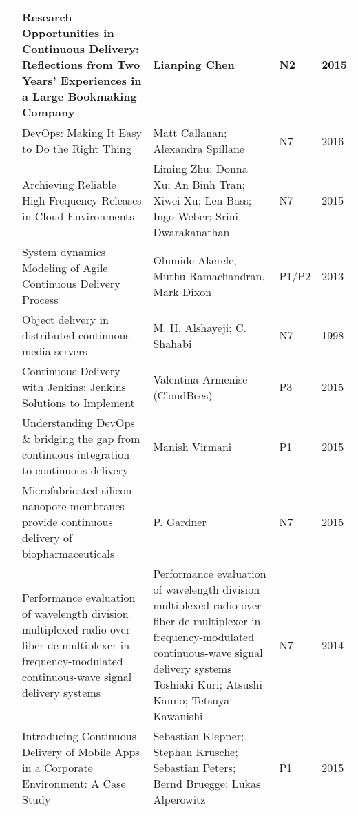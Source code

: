 \begin{landscape}
\begin{longtable}{|l|L{10cm}|L{10cm}|l|l|}
      & Research Opportunities in Continuous Delivery: Reflections from Two Years' Experiences in a Large Bookmaking Company & Lianping Chen & N2 & 2015\\ \hline
    
     & DevOps: Making It Easy to Do the Right Thing & Matt Callanan; Alexandra Spillane & N7 & 2016 \\ \hline
    
     & Archieving Reliable High-Frequency Releases in Cloud Environments & Liming Zhu; Donna Xu; An Binh Tran; Xiwei Xu; Len Bass; Ingo Weber; Srini Dwarakanathan & N7 & 2015 \\ \hline
    
     & System dynamics Modeling of Agile Continuous Delivery Process & Olumide Akerele, Muthu Ramachandran, Mark Dixon & P1/P2 & 2013 \\ \hline
    
     & Object delivery in distributed continuous media servers & M. H. Alshayeji; C. Shahabi & N7 & 1998 \\ \hline
    
     & Continuous Delivery with Jenkins: Jenkins Solutions to Implement & Valentina Armenise (CloudBees) & P3 & 2015\\ \hline
    
      & Understanding DevOps \& bridging the gap from continuous integration to continuous delivery & Manish Virmani & P1 & 2015 \\ \hline
    
     & Microfabricated silicon nanopore membranes provide continuous delivery of biopharmaceuticals & P. Gardner & N7 & 2015 \\ \hline
    
     & Performance evaluation of wavelength division multiplexed radio-over-fiber de-multiplexer in frequency-modulated continuous-wave signal delivery systems & 
    Performance evaluation of wavelength division multiplexed radio-over-fiber de-multiplexer in frequency-modulated continuous-wave signal delivery systems
    Toshiaki Kuri; Atsushi Kanno; Tetsuya Kawanishi & N7 & 2014 \\ \hline
    
     & Introducing Continuous Delivery of Mobile Apps in a Corporate Environment: A Case Study & Sebastian Klepper; Stephan Krusche; Sebastian Peters; Bernd Bruegge; Lukas Alperowitz & P1 & 2015 \\ \hline
    

\end{longtable}
\end{landscape}
